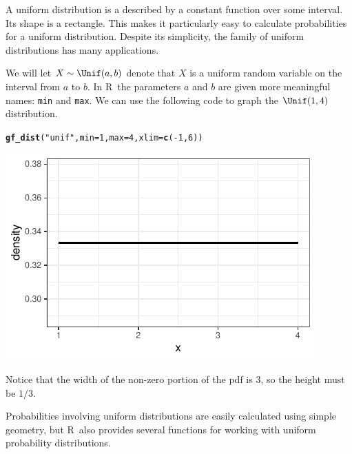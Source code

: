 \documentclass[twoside]{book}\usepackage[]{graphicx}\usepackage[]{xcolor}
\makeatletter
\def\maxwidth{ %
  \ifdim\Gin@nat@width>\linewidth
    \linewidth
  \else
    \Gin@nat@width
  \fi
}
\newcommand{\hlnum}[1]{\textcolor[rgb]{0.686,0.059,0.569}{#1}}%
\newcommand{\hlstr}[1]{\textcolor[rgb]{0.192,0.494,0.8}{#1}}%
\newcommand{\hlopt}[1]{\textcolor[rgb]{0,0,0}{#1}}%
\newcommand{\hlstd}[1]{\textcolor[rgb]{0.345,0.345,0.345}{#1}}%
\newcommand{\hlkwc}[1]{\textcolor[rgb]{0.333,0.667,0.333}{#1}}%
\newcommand{\hlkwd}[1]{\textcolor[rgb]{0.737,0.353,0.396}{\textbf{#1}}}%
\newenvironment{kframe}{%
 \def\at@end@of@kframe{}%
 \ifinner\ifhmode%
  \def\at@end@of@kframe{\end{minipage}}%
  \begin{minipage}{\columnwidth}%
 \fi\fi%
 \def\FrameCommand##1{\hskip\@totalleftmargin \hskip-\fboxsep
 \colorbox{shadecolor}{##1}\hskip-\fboxsep
     \hskip-\linewidth \hskip-\@totalleftmargin \hskip\columnwidth}%
 \MakeFramed {\advance\hsize-\width
   \@totalleftmargin\z@ \linewidth\hsize
   \@setminipage}}%
 {\par\unskip\endMakeFramed%
 \at@end@of@kframe}
\newenvironment{knitrout}{}{} %
\renewcommand{\code}[1]{{\color{blue!80!black}\texttt{#1}}}
\def\R{{\sf R}}
\makeatother
\begin{document}
A uniform distribution is a described by a constant function over some interval.  Its 
shape is a rectangle.  This makes it particularly easy to calculate probabilities 
for a uniform distribution.  Despite its simplicity, the family of uniform distributions
has many applications.

We will let $X \sim \Unif(a,b)$ denote that $X$ is a uniform random variable on 
the interval from $a$ to $b$. 
In \R\, the parameters $a$ and $b$ are given more meaningful names: \code{min} and \code{max}.
We can use the following code to graph the $\Unif(1,4)$ distribution.

\begin{knitrout}
\color{fgcolor}\begin{kframe}
\begin{alltt}
\hlkwd{gf_dist}\hlstd{(}\hlstr{"unif"}\hlstd{,} \hlkwc{min} \hlstd{=} \hlnum{1}\hlstd{,} \hlkwc{max} \hlstd{=} \hlnum{4}\hlstd{,} \hlkwc{xlim} \hlstd{=} \hlkwd{c}\hlstd{(}\hlopt{-}\hlnum{1}\hlstd{,} \hlnum{6}\hlstd{))}
\end{alltt}
\end{kframe}

{\centering \includegraphics[width=\maxwidth]{figures/fig-unnamed-chunk-76-1} 

}



\end{knitrout}
Notice that the width of the non-zero portion of the pdf is 3, so the height must be $1/3$.

Probabilities involving uniform distributions are easily calculated using simple geometry,
but \R\ also provides several functions for working with uniform probability distributions.
\end{document}
